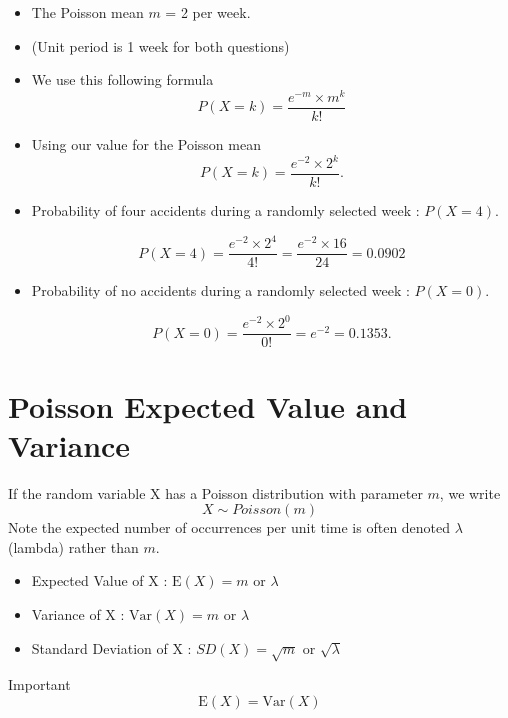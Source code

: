 \documentclass[a4paper,12pt]{article}
\begin{document}
\begin{itemize}
	\item The Poisson mean $m$ = 2  per week.
	\item (Unit period is 1 week for both questions)
	\item We use this following formula
	\[ P(X=k) =  \frac{e^{-m} \times m ^k}{k!}  \]
	\item Using our value for the Poisson mean
	\[ P(X=k) =  \frac{e^{-2} \times 2^k}{k!} . \]
	
	\item Probability of four accidents during a randomly selected week : $ P(X = 4)$.
	
	\[ P(X=4) =  \frac{e^{-2} \times 2^4}{4!} = \frac{e^{-2} \times 16}{24} = 0.0902\]
	
	\item Probability of no accidents during a randomly selected week : $ P(X = 0)$.
	
	\[ P(X=0) =  \frac{e^{-2} \times 2^0}{0!} = e^{-2} = 0.1353. \]
	
	
\end{itemize}



\newpage
\section*{Poisson Expected Value and Variance}


If the random variable X has a Poisson distribution with parameter $m$, we write
\[ X \sim Poisson(m) \]
Note the expected number of occurrences per unit time is often denoted $\lambda$ (lambda) rather than $m$.

% 




\begin{itemize}
	\item Expected Value of X : $\mbox{E}(X)=  m \mbox{ or } \lambda$
	\item Variance of X : $\mbox{Var}(X) = m \mbox{ or } \lambda$
	\item Standard Deviation of X : $SD(X) = \sqrt{m} \mbox{ or } \sqrt{\lambda}$
\end{itemize}

\noindent Important 
\[ \mbox{E}(X) = \mbox{Var}(X)\]
\end{document}
